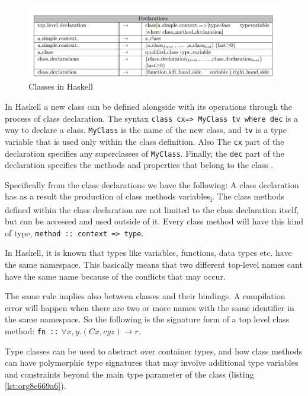\documentclass[a4paper, titlepage, twoside]{article}
\begin{document}
\begin{figure}[htbp]
\centering
\includegraphics[width=.9\linewidth]{img/2023-05-25_13-28-35_screenshot.png}
\caption{\label{fig:org45373f2}Classes in Haskell}
\end{figure}

In Haskell a new class can be defined alongside with its operations through the process of class declaration. The syntax \texttt{class cx=> MyClass tv where dec} is a way to declare a class. \texttt{MyClass} is the name of the new class, and \texttt{tv} is a type variable that is used only within the class definition. Also The \texttt{cx} part of the declaration specifies any superclasses of \texttt{MyClass}. Finally, the \texttt{dec} part of the declaration specifies the methods and properties that belong to the class \autocite[chapter 4.3]{marlowHaskell2010Language2010}.

Specifically from the class declarations we have the following: A class declaration has as a result the production of class methods variables\textsubscript{i}. The class methods defined within the class declaration are not limited to the class declaration itself, but can be accessed and used outside of it. Every class method will have this kind of type, \texttt{method :: context => type}.

In Haskell, it is known that types like variables, functions, data types etc. have the same namespace. This basically means that two different top-level names cant have the same name because of the conflicts that may occur.

The same rule implies also between classes and their bindings. A compilation error will happen when there are two or more names with the same identifier in the same namespace. So the following is the signature form of a top level class method: \texttt{fn ::} \(\forall x, y. (Cx, cyz) \rightarrow r\).

Type classes can be used to abstract over container types, and how class methods can have polymorphic type signatures that may involve additional type variables and constraints beyond the main type parameter of the class (listing \ref{lst:org8e669a6}).
\end{document}
